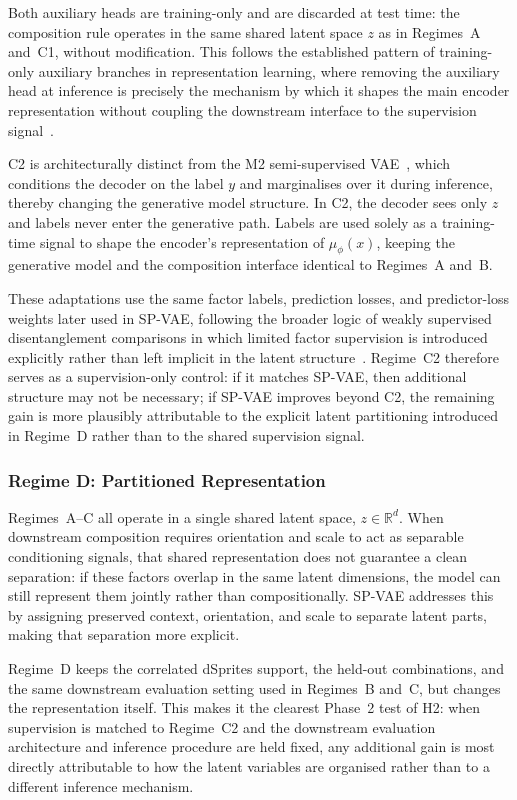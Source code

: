 Both auxiliary heads are training-only and are discarded at test time: the composition rule
operates in the same shared latent space $z$ as in Regimes~A and~C1, without modification.
This follows the established pattern of training-only auxiliary branches in representation
learning, where removing the auxiliary head at inference is precisely the mechanism by which it
shapes the main encoder representation without coupling the downstream interface to the
supervision signal~\citep{chen2020simple}.

C2 is architecturally distinct from the M2 semi-supervised VAE~\citep{kingma2014semi}, which
conditions the decoder on the label $y$ and marginalises over it during inference, thereby
changing the generative model structure. In C2, the decoder sees only $z$ and labels never
enter the generative path. Labels are used solely as a training-time signal to shape the
encoder's representation of $\mu_\phi(x)$, keeping the generative model and the composition
interface identical to Regimes~A and~B.

These adaptations use the same factor labels, prediction losses, and predictor-loss weights
later used in SP-VAE, following the broader logic of weakly supervised disentanglement
comparisons in which limited factor supervision is introduced explicitly rather than left
implicit in the latent structure~\citep{locatello2020weakly}. Regime~C2 therefore serves as a
supervision-only control: if it matches SP-VAE, then additional structure may not be necessary;
if SP-VAE improves beyond C2, the remaining gain is more plausibly attributable to the explicit
latent partitioning introduced in Regime~D rather than to the shared supervision signal.

\subsubsection{Regime D: Partitioned Representation}
\label{subsec:p2_spvae}

Regimes~A--C all operate in a single shared latent space, $z \in \mathbb{R}^d$. When downstream
composition requires orientation and scale to act as separable conditioning signals, that shared
representation does not guarantee a clean separation: if these factors overlap in the same latent
dimensions, the model can still represent them jointly rather than compositionally. SP-VAE
addresses this by assigning preserved context, orientation, and scale to separate latent parts,
making that separation more explicit.

Regime~D keeps the correlated dSprites support, the held-out combinations, and the same downstream
evaluation setting used in Regimes~B and~C, but changes the representation itself.
This makes it the clearest Phase~2 test of H2: when supervision is matched to Regime~C2 and the downstream evaluation architecture and inference
procedure are held fixed, any additional gain is most directly attributable to how the
latent variables are organised rather than to a different inference mechanism.

